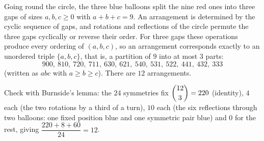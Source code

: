 Going round the circle, the three blue balloons split the nine red ones into three gaps of sizes $a,b,c\ge0$ with $a+b+c=9$. An arrangement is determined by the cyclic sequence of gaps, and rotations and reflections of the circle permute the three gaps cyclically or reverse their order. For three gaps these operations produce every ordering of $(a,b,c)$, so an arrangement corresponds exactly to an unordered triple $\{a,b,c\}$, that is, a partition of $9$ into at most $3$ parts:
\[
900,\ 810,\ 720,\ 711,\ 630,\ 621,\ 540,\ 531,\ 522,\ 441,\ 432,\ 333
\]
(written as $abc$ with $a\ge b\ge c$). There are $\boxed{12}$ arrangements.

Check with Burnside's lemma: the $24$ symmetries fix $\dbinom{12}{3}=220$ (identity), $4$ each (the two rotations by a third of a turn), $10$ each (the six reflections through two balloons: one fixed position blue and one symmetric pair blue) and $0$ for the rest, giving $\dfrac{220+8+60}{24}=12$.
